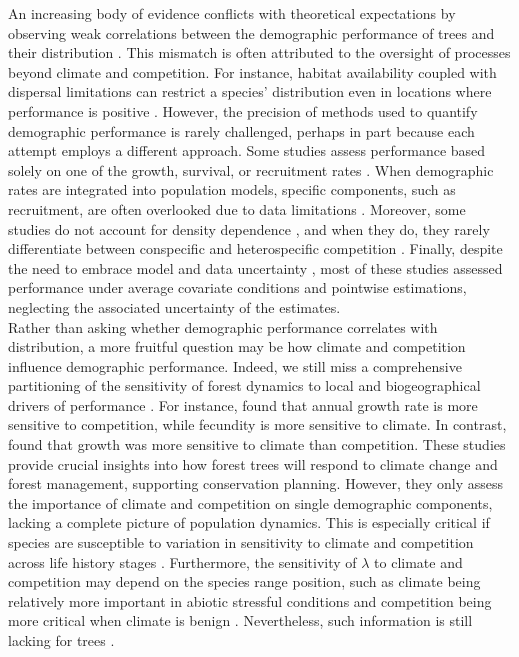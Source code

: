An increasing body of evidence conflicts with theoretical expectations
by observing weak correlations between the demographic performance of
trees and their distribution
\citep{McGill2012, Thuiller2014, Csergo2017, bohner2020, LeSquin2021, Midolo2021, Guyennon2023}.
This mismatch is often attributed to the oversight of processes beyond
climate and competition. For instance, habitat availability coupled with
dispersal limitations can restrict a species' distribution even in
locations where performance is positive \citep{Pulliam2000}. However,
the precision of methods used to quantify demographic performance is
rarely challenged, perhaps in part because each attempt employs a
different approach. Some studies assess performance based solely on one
of the growth, survival, or recruitment rates
\citep{McGill2012, bohner2020}. When demographic rates are integrated
into population models, specific components, such as recruitment, are
often overlooked due to data limitations
\citep{Kunstler2021, LeSquin2021}. Moreover, some studies do not account
for density dependence \citep{Csergo2017, Ohse2023}, and when they do,
they rarely differentiate between conspecific and heterospecific
competition \citep{bohner2020, LeSquin2021}. Finally, despite the need
to embrace model and data uncertainty \citep{MilnerGulland2017a}, most
of these studies assessed performance under average covariate conditions
and pointwise estimations, neglecting the associated uncertainty of the
estimates.\\

Rather than asking whether demographic performance correlates with
distribution, a more fruitful question may be how climate and
competition influence demographic performance. Indeed, we still miss a
comprehensive partitioning of the sensitivity of forest dynamics to
local and biogeographical drivers of performance \citep{Ohse2023}. For
instance, \citet{Clark2011} found that annual growth rate is more
sensitive to competition, while fecundity is more sensitive to climate.
In contrast, \citet{CopenhaverParry2016} found that growth was more
sensitive to climate than competition. These studies provide crucial
insights into how forest trees will respond to climate change and forest
management, supporting conservation planning. However, they only assess
the importance of climate and competition on single demographic
components, lacking a complete picture of population dynamics. This is
especially critical if species are susceptible to variation in
sensitivity to climate and competition across life history stages
\citep{Russell2012, Ettinger2013}. Furthermore, the sensitivity of
\(\lambda\) to climate and competition may depend on the species range
position, such as climate being relatively more important in abiotic
stressful conditions and competition being more critical when climate is
benign \citep{Louthan2015}. Nevertheless, such information is still
lacking for trees \citep{Ohse2023}.\\

